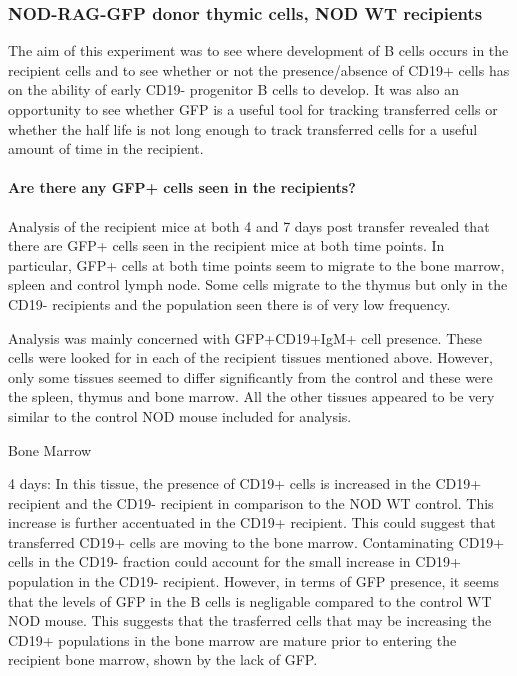 
\subsubsection{NOD-RAG-GFP donor thymic cells, NOD WT recipients}

The aim of this experiment was to see where development of B cells occurs in the recipient cells and to see whether or not the presence/absence of CD19+ cells has on the ability of early CD19- progenitor B cells to develop.
It was also an opportunity to see whether GFP is a useful tool for tracking transferred cells or whether the half life is not long enough to track transferred cells for a useful amount of time in the recipient.

\paragraph{Are there any GFP+ cells seen in the recipients?}

Analysis of the recipient mice at both 4 and 7 days post transfer revealed that there are GFP+ cells seen in the recipient mice at both time points.
In particular, GFP+ cells at both time points seem to migrate to the bone marrow, spleen and control lymph node. 
Some cells migrate to the thymus but only in the CD19- recipients and the population seen there is of very low frequency.

Analysis was mainly concerned with GFP+CD19+IgM+ cell presence.
These cells were looked for in each of the recipient tissues mentioned above.
However, only some tissues seemed to differ significantly from the control and these were the spleen, thymus and bone marrow.
All the other tissues appeared to be very similar to the control NOD mouse included for analysis.

Bone Marrow

4 days:
In this tissue, the presence of CD19+ cells is increased in the CD19+ recipient and the CD19- recipient in comparison to the NOD WT control.
This increase is further accentuated in the CD19+ recipient.
This could suggest that transferred CD19+ cells are moving to the bone marrow.
Contaminating CD19+ cells in the CD19- fraction could account for the small increase in CD19+ population in the CD19- recipient.
However, in terms of GFP presence, it seems that the levels of GFP in the B cells is negligable compared to the control WT NOD mouse.
This suggests that the trasferred cells that may be increasing the CD19+ populations in the bone marrow are mature prior to entering the recipient bone marrow, shown by the lack of GFP.

